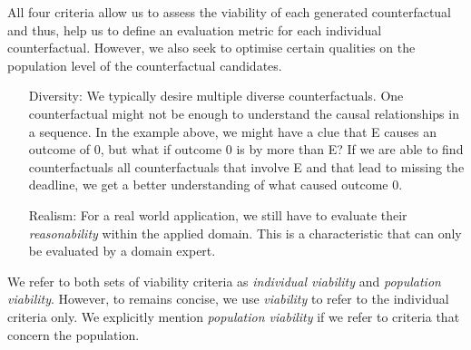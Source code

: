 \documentclass[./../../paper.tex]{subfiles}
\begin{document}
\noindent All four criteria allow us to assess the viability of each generated counterfactual and thus, help us to define an evaluation metric for each individual counterfactual. However, we also seek to optimise certain qualities on the population level of the counterfactual candidates.  

\begin{itemize}
    \item[Diversity:] We typically desire multiple diverse counterfactuals. One counterfactual might not be enough to understand the causal relationships in a sequence. In the example above, we might have a clue that E causes an outcome of 0, but what if outcome 0 is by more than E? If we are able to find counterfactuals all counterfactuals that involve E and that lead to missing the deadline, we get a better understanding of what caused outcome 0.
    \item[Realism:] For a real world application, we still have to evaluate their \emph{reasonability} within the applied domain. This is a characteristic that can only be evaluated by a domain expert. 
\end{itemize}

We refer to both sets of viability criteria as \emph{individual viability} and \emph{population viability}. However, to remains concise, we use \emph{viability} to refer to the individual criteria only. We explicitly mention \emph{population viability} if we refer to criteria that concern the population.
\end{document}
